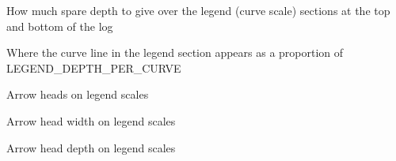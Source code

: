 \documentclass[letterpaper,10pt,english]{sphinxmanual}
\begin{document}
\begin{fulllineitems}
\begin{fulllineitems}
\end{fulllineitems}


\begin{fulllineitems}
\label{\detokenize{ref/util/plot/Plot:TotalDepth.util.plot.Plot.Plot.LEGEND_DEPTH_SPARE}}
How much spare depth to give over the legend (curve scale) sections at
the top and bottom of the log

\end{fulllineitems}


\begin{fulllineitems}
\label{\detokenize{ref/util/plot/Plot:TotalDepth.util.plot.Plot.Plot.LEGEND_HORIZONTAL_LINE_DEPTH_PROPORTION}}
Where the curve line in the legend section appears as a proportion of
LEGEND\_DEPTH\_PER\_CURVE

\end{fulllineitems}


\begin{fulllineitems}
\label{\detokenize{ref/util/plot/Plot:TotalDepth.util.plot.Plot.Plot.LEGEND_ARROW_DISPLAY}}
Arrow heads on legend scales

\end{fulllineitems}


\begin{fulllineitems}
\label{\detokenize{ref/util/plot/Plot:TotalDepth.util.plot.Plot.Plot.LEGEND_ARROW_WIDTH}}
Arrow head width on legend scales

\end{fulllineitems}


\begin{fulllineitems}
\label{\detokenize{ref/util/plot/Plot:TotalDepth.util.plot.Plot.Plot.LEGEND_ARROW_DEPTH}}
Arrow head depth on legend scales


\end{fulllineitems}
\end{fulllineitems}
\end{document}
